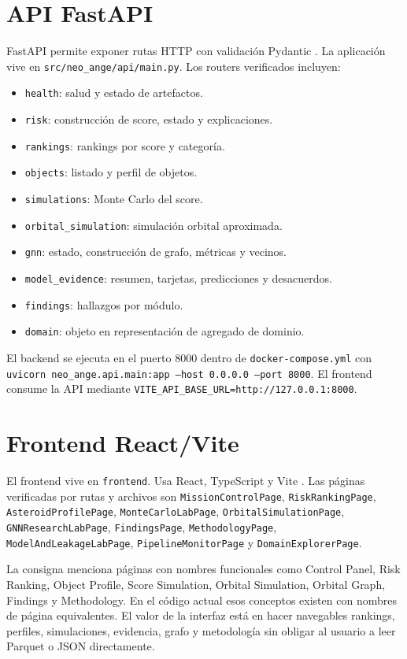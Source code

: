 \documentclass[12pt,a4paper]{report}
\newcommand{\code}[1]{\texttt{#1}}
\DeclareRobustCommand{\filepath}[1]{\nolinkurl{#1}}
\begin{document}
\chapter{API FastAPI}

FastAPI permite exponer rutas HTTP con validación Pydantic \cite{fastapi_docs}. La aplicación vive en \filepath{src/neo_ange/api/main.py}. Los routers verificados incluyen:

\begin{itemize}
  \item \code{health}: salud y estado de artefactos.
  \item \code{risk}: construcción de score, estado y explicaciones.
  \item \code{rankings}: rankings por score y categoría.
  \item \code{objects}: listado y perfil de objetos.
  \item \code{simulations}: Monte Carlo del score.
  \item \code{orbital\_simulation}: simulación orbital aproximada.
  \item \code{gnn}: estado, construcción de grafo, métricas y vecinos.
  \item \code{model\_evidence}: resumen, tarjetas, predicciones y desacuerdos.
  \item \code{findings}: hallazgos por módulo.
  \item \code{domain}: objeto en representación de agregado de dominio.
\end{itemize}

El backend se ejecuta en el puerto 8000 dentro de \filepath{docker-compose.yml} con \code{uvicorn neo\_ange.api.main:app --host 0.0.0.0 --port 8000}. El frontend consume la API mediante \code{VITE\_API\_BASE\_URL=http://127.0.0.1:8000}.

\chapter{Frontend React/Vite}

El frontend vive en \filepath{frontend}. Usa React, TypeScript y Vite \cite{react_docs,vite_docs}. Las páginas verificadas por rutas y archivos son \code{MissionControlPage}, \code{RiskRankingPage}, \code{AsteroidProfilePage}, \code{MonteCarloLabPage}, \code{OrbitalSimulationPage}, \code{GNNResearchLabPage}, \code{FindingsPage}, \code{MethodologyPage}, \code{ModelAndLeakageLabPage}, \code{PipelineMonitorPage} y \code{DomainExplorerPage}.

La consigna menciona páginas con nombres funcionales como Control Panel, Risk Ranking, Object Profile, Score Simulation, Orbital Simulation, Orbital Graph, Findings y Methodology. En el código actual esos conceptos existen con nombres de página equivalentes. El valor de la interfaz está en hacer navegables rankings, perfiles, simulaciones, evidencia, grafo y metodología sin obligar al usuario a leer Parquet o JSON directamente.
\end{document}
